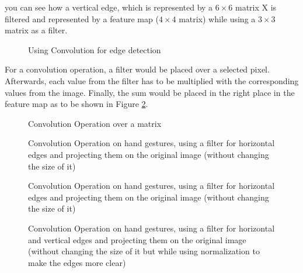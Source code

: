 you can see how a vertical edge, which is represented by a
\( 6 \times 6\) matrix X is filtered and represented by a feature map (\( 4 \times 4\) matrix) while using a \( 3 \times 3\) matrix as a filter.

\begin{figure}[htp]
	\centering
	\caption{Using Convolution for edge detection}
	\label{fig:edge_detec}
\end{figure}

For a convolution operation, a filter would be placed over a selected pixel. Afterwards, each value from the filter has to be multiplied with the corresponding values from the image. Finally, the sum would be placed in the right place in the feature map as to be shown in Figure \ref{fig:conv}.

\begin{figure}[htp]
	\centering
	\caption{Convolution Operation over a matrix}
	\label{fig:conv}
\end{figure}

\begin{figure}[htp]
	\centering
	\caption{Convolution Operation on hand gestures, using a filter for horizontal edges and projecting them on the original image (without changing the size of it)}
	\label{fig:horizontal}
\end{figure}

\begin{figure}[htp]
	\centering
	\caption{Convolution Operation on hand gestures, using a filter for horizontal edges and projecting them on the original image (without changing the size of it)}
	\label{fig:vert}
\end{figure}

\begin{figure}[htp]
	\centering
	\caption{Convolution Operation on hand gestures, using a filter for horizontal and vertical edges and projecting them on the original image (without changing the size of it but while using normalization to make the edges more clear)}
	\label{fig:edges}
\end{figure}

